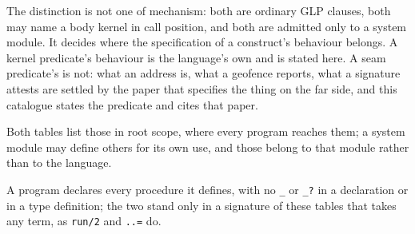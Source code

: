 The distinction is not one of mechanism: both are ordinary GLP clauses, both may name a body kernel in call position, and both are admitted only to a system module. It decides where the specification of a construct's behaviour belongs. A kernel predicate's behaviour is the language's own and is stated here. A seam predicate's is not: what an address is, what a geofence reports, what a signature attests are settled by the paper that specifies the thing on the far side, and this catalogue states the predicate and cites that paper.

Both tables list those in root scope, where every program reaches them; a system module may define others for its own use, and those belong to that module rather than to the language.

A program declares every procedure it defines, with no \verb|_| or \verb|_?| in a declaration or in a type definition; the two stand only in a signature of these tables that takes any term, as \verb|run/2| and \verb|..=| do.

